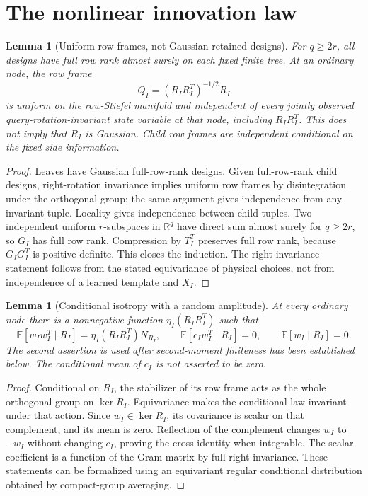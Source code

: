\documentclass[11pt,oneside,openany,a4paper]{book}
\numberwithin{equation}{chapter}
\newtheorem{lemma}[theorem]{Lemma}
\theoremstyle{definition}
\theoremstyle{remark}
\newcommand{\R}{\mathbb R}\newcommand{\E}{\mathbb E}\newcommand{\Prb}{\mathbb P}\newcommand{\PP}{\mathbb P}
\begin{document}
\section{The nonlinear innovation law}
\begin{lemma}[Uniform row frames, not Gaussian retained designs]\label{nonlinear:lem:haar}
For $q\ge2r$, all designs have full row rank almost surely on each fixed finite tree. At an ordinary node, the row frame
\[
 Q_I=(R_IR_I^T)^{-1/2}R_I
\]
is uniform on the row-Stiefel manifold and independent of every jointly observed query-rotation-invariant state variable at that node, including $R_IR_I^T$. This does not imply that $R_I$ is Gaussian. Child row frames are independent conditional on the fixed side information.
\end{lemma}
\begin{proof}
Leaves have Gaussian full-row-rank designs. Given full-row-rank child designs, right-rotation invariance implies uniform row frames by disintegration under the orthogonal group; the same argument gives independence from any invariant tuple. Locality gives independence between child tuples. Two independent uniform $r$-subspaces in $\R^q$ have direct sum almost surely for $q\ge2r$, so $G_I$ has full row rank. Compression by $T_I^T$ preserves full row rank, because $G_IG_I^T$ is positive definite. This closes the induction. The right-invariance statement follows from the stated equivariance of physical choices, not from independence of a learned template and $X_I$.
\end{proof}

\begin{lemma}[Conditional isotropy with a random amplitude]\label{nonlinear:lem:isotropy}
At every ordinary node there is a nonnegative function $\eta_I(R_IR_I^T)$ such that
\begin{equation}\label{nonlinear:eq:isotropy}
 \E[w_Iw_I^T\mid R_I]=\eta_I(R_IR_I^T)N_{R_I},\qquad
 \E[c_Iw_I^T\mid R_I]=0,\qquad \E[w_I\mid R_I]=0.
\end{equation}
The second assertion is used after second-moment finiteness has been established below. The conditional mean of $c_I$ is not asserted to be zero.
\end{lemma}
\begin{proof}
Conditional on $R_I$, the stabilizer of its row frame acts as the whole orthogonal group on $\ker R_I$. Equivariance makes the conditional law invariant under that action. Since $w_I\in\ker R_I$, its covariance is scalar on that complement, and its mean is zero. Reflection of the complement changes $w_I$ to $-w_I$ without changing $c_I$, proving the cross identity when integrable. The scalar coefficient is a function of the Gram matrix by full right invariance. These statements can be formalized using an equivariant regular conditional distribution obtained by compact-group averaging.
\end{proof}
\end{document}
